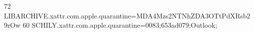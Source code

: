 72 LIBARCHIVE.xattr.com.apple.quarantine=MDA4Mzs2NTNhZDA3OTtPdXRsb29rOw
60 SCHILY.xattr.com.apple.quarantine=0083;653ad079;Outlook;
